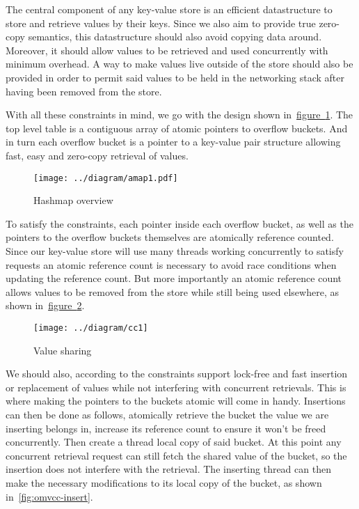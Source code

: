 \documentclass[11pt]{book}
\newcommand{\marios}[1]{\noindent{{\bf \fbox{MK:} {\textcolor{green}{\it#1}}}}}
\begin{document}
The central component of any key-value store is an efficient
datastructure to store and retrieve values by their keys. Since we
also aim to provide true zero-copy semantics, this datastructure
should also avoid copying data around. Moreover, it should allow
values to be retrieved and used concurrently with minimum overhead.
A way to make values live outside of the store should also be provided
in order to permit said values to be held in the networking stack
after having been removed from the store.

With all these constraints in mind, we go with the design shown
in~\hyperref[fig:hashmap]{figure~\ref{fig:hashmap}}. The top level
table is a contiguous array of atomic pointers to overflow
buckets. And in turn each overflow bucket \marios{entry?} is a pointer to a key-value
pair structure allowing fast, easy and zero-copy retrieval of values.

\begin{figure}[htb!]
  \texttt{[image: ../diagram/amap1.pdf]}
  \caption{Hashmap overview}
  \label{fig:hashmap}
\end{figure}

To satisfy the constraints, each pointer inside each overflow bucket,
as well as the pointers to the overflow buckets themselves are
atomically reference counted. Since our key-value store will use many
threads working concurrently to satisfy requests an atomic reference
count is necessary to avoid race conditions when updating the
reference count. But more importantly an atomic reference count allows
values to be removed from the store while still being used elsewhere,
as shown
in~\hyperref[fig:value-sharing]{figure~\ref{fig:value-sharing}}.

\begin{figure}[htb!]
  \texttt{[image: ../diagram/cc1]}
  \caption{Value sharing}
  \label{fig:value-sharing}
\end{figure}

\marios{Pick 1,2 cases such as an update and a delete and walk the reader through it. It will be way cleaner this way. Make the example names bold so that someone will know and read for a key update for example.}

We should also, according to the constraints support lock-free and
fast insertion or replacement of values while not interfering with
concurrent retrievals. This is where making the pointers to the
buckets atomic will come in handy. Insertions can then be done as
follows, atomically retrieve the bucket the value we are inserting
belongs in, increase its reference count to ensure it won't be freed
concurrently. Then create a thread local copy of said bucket. At this
point any concurrent retrieval request can still fetch the shared
value of the bucket, so the insertion does not interfere with the
retrieval. The inserting thread can then make the necessary
modifications to its local copy of the bucket, as shown
in~\ref{fig:omvcc-insert}.
\end{document}
